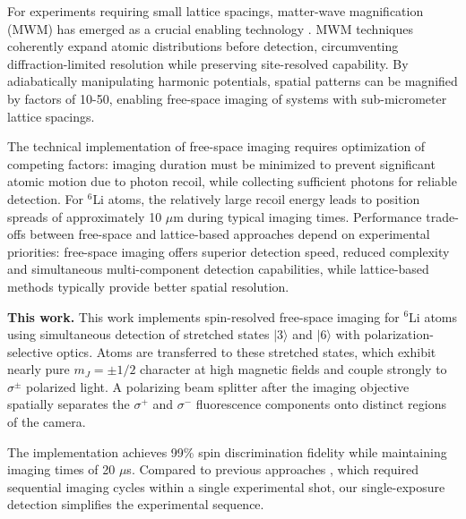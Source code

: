 For experiments requiring small lattice spacings, matter-wave magnification (MWM) has emerged as a crucial enabling technology \cite{murthy_matter-wave_2014, asteria_quantum_2021}. MWM techniques coherently expand atomic distributions before detection, circumventing diffraction-limited resolution while preserving site-resolved capability. By adiabatically manipulating harmonic potentials, spatial patterns can be magnified by factors of 10-50, enabling free-space imaging of systems with sub-micrometer lattice spacings.

The technical implementation of free-space imaging requires optimization of competing factors: imaging duration must be minimized to prevent significant atomic motion due to photon recoil, while collecting sufficient photons for reliable detection. For $^6$Li atoms, the relatively large recoil energy leads to position spreads of approximately 10 $\mu$m during typical imaging times. Performance trade-offs between free-space and lattice-based approaches depend on experimental priorities: free-space imaging offers superior detection speed, reduced complexity and simultaneous multi-component detection capabilities, while lattice-based methods typically provide better spatial resolution.


\textbf{This work.} This work implements spin-resolved free-space imaging for $^6$Li atoms using simultaneous detection of stretched states $|3\rangle$ and $|6\rangle$ with polarization-selective optics. Atoms are transferred to these stretched states, which exhibit nearly pure $m_J = \pm 1/2$ character at high magnetic fields and couple strongly to $\sigma^{\pm}$ polarized light. A polarizing beam splitter after the imaging objective spatially separates the $\sigma^+$ and $\sigma^-$ fluorescence components onto distinct regions of the camera.

The implementation achieves 99\% spin discrimination fidelity while maintaining imaging times of 20 $\mu$s. Compared to previous approaches \cite{bergschneider_spin-resolved_2018}, which required sequential imaging cycles within a single experimental shot, our single-exposure detection simplifies the experimental sequence.

